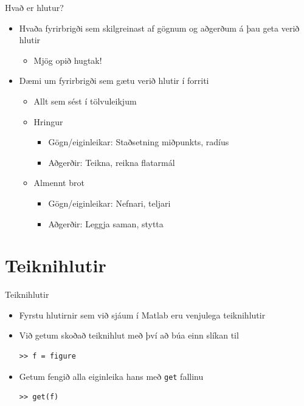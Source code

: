 \documentclass{beamer}
\begin{document}
\begin{frame}{Hvað er hlutur?}
\pause
\begin{itemize}
 \item Hvaða fyrirbrigði sem skilgreinast af gögnum og aðgerðum á þau geta verið hlutir
 \begin{itemize}
  \item Mjög opið hugtak! \pause
 \end{itemize}
 \item Dæmi um fyrirbrigði sem gætu verið hlutir í forriti \pause
 \begin{itemize}
  \item Allt sem sést í tölvuleikjum
  \item Hringur
  \begin{itemize}
   \item Gögn/eiginleikar: Staðsetning miðpunkts, radíus
   \item Aðgerðir: Teikna, reikna flatarmál
  \end{itemize} 
  \item Almennt brot
  \begin{itemize}
   \item Gögn/eiginleikar: Nefnari, teljari
   \item Aðgerðir: Leggja saman, stytta
  \end{itemize}
 \end{itemize}
\end{itemize}
\end{frame}

\section{Teiknihlutir}

\begin{frame}[fragile]{Teiknihlutir}
\begin{itemize}
 \item Fyrstu hlutirnir sem við sjáum í Matlab eru venjulega teiknihlutir
 \item Við getum skoðað teiknihlut með því að búa einn slíkan til
\begin{verbatim}
>> f = figure
\end{verbatim}
 \item Getum fengið alla eiginleika hans með \texttt{get} fallinu
\begin{verbatim}
>> get(f)
\end{verbatim}
\end{itemize}

\end{frame}
\end{document}
